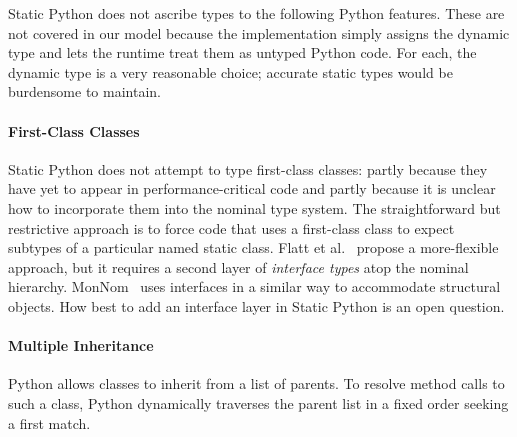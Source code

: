 \documentclass[english,cleveref,submission]{programming}
\newcommand{\SP}{Static Python}
\begin{document}
\SP{} does not ascribe types to the following Python features.
These are not covered in our model because the implementation simply
assigns the dynamic type and lets the runtime treat them as untyped
Python code.
For each, the dynamic type is a very reasonable choice;
accurate static types would be burdensome to maintain.


\paragraph{First-Class Classes}

\SP{} does not attempt to type first-class classes: partly because they have
yet to appear in performance-critical code and partly because it
is unclear how to incorporate them into the nominal type system.
The straightforward but restrictive approach is to force code that uses a
first-class class to expect subtypes of a particular named static class.
Flatt et al.~\cite{fkf-popl-1998} propose a more-flexible approach, %
but it requires a second layer of \emph{interface types} atop the nominal hierarchy.
MonNom~\cite{mt-oopsla-2021} uses interfaces in a similar way to accommodate
structural objects.
How best to add an interface layer in \SP{} is an open question.




\paragraph{Multiple Inheritance}


Python allows classes to inherit from a list of parents.
To resolve method calls to such a class, Python
dynamically traverses the parent list in a fixed order
seeking a first match.
\end{document}

